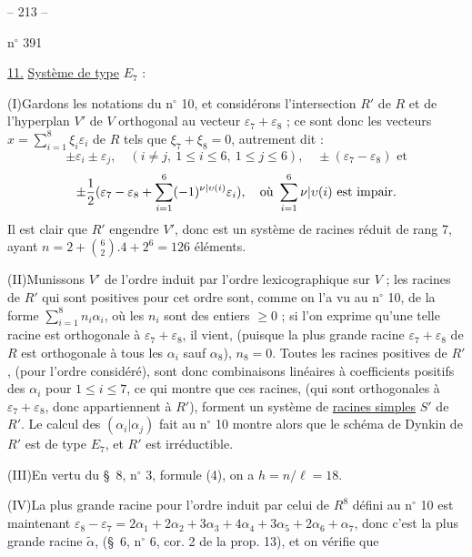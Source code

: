 \begin{center}-- 213 --\end{center}
\hfill n$^\circ$ 391

\uline{11.} \uline{Système de type} $E_7$ :

(I)\quad Gardons les notations du n$^\circ$ 10, et considérons l'intersection $R'$
de $R$ et de l'hyperplan $V'$ de $V$ orthogonal au vecteur
$\varepsilon_7+\varepsilon_8$ ; ce sont donc les vecteurs
$x=\sum_{i=1}^8\xi_i\varepsilon_i$ de $R$ tels que $\xi_7+\xi_8=0$,
autrement dit :
\[
\pm\varepsilon_i\pm\varepsilon_j,\quad
(i\neq j,\ 1\leq i\leq6,\ 1\leq j\leq6),\quad
\pm(\varepsilon_7-\varepsilon_8)\text{ et}
\]
\[
\pm\frac12(\varepsilon_7-\varepsilon_8+
\sum_{i=1}^6(-1)^{{\nu|\upsilon}(i)}\varepsilon_i),
\quad\text{où }\sum_{i=1}^6{\nu|\upsilon}(i)\text{ est {impair}.}
\]
Il est clair que $R'$ engendre $V'$, donc est un système de racines réduit
de rang 7, ayant $n=2+\binom62.4+2^6=126$ éléments.

(II)\quad Munissons $V'$ de l'ordre induit par l'ordre lexicographique sur $V$ ;
les racines de $R'$ qui sont positives pour cet ordre sont, comme on l'a vu au
n$^\circ$ 10, de la forme $\sum_{i=1}^8n_i\alpha_i$, où les $n_i$ sont des entiers
$\geq0$ ; si l'on exprime qu'une telle racine est orthogonale à
$\varepsilon_7+\varepsilon_8$, il vient, (puisque la plus grande racine
$\varepsilon_7+\varepsilon_8$ de $R$ est orthogonale à tous les $\alpha_i$
sauf $\alpha_8$), $n_8=0$. Toutes les racines positives de $R'$,
(pour l'ordre considéré), sont donc combinaisons linéaires à coefficients positifs
des $\alpha_i$ pour $1\leq i\leq7$, ce qui montre que ces racines,
(qui sont orthogonales à $\varepsilon_7+\varepsilon_8$, donc appartiennent à $R'$),
forment un système de \uline{racines simples} $S'$ de $R'$.
Le calcul des $(\alpha_i|\alpha_j)$ fait au n$^\circ$ 10 montre alors que le
schéma de Dynkin de $R'$ est de type $E_7$, et $R'$ est irréductible.

(III)\quad En vertu du \S\ 8, n$^\circ$ 3, formule (4), on a $h=n/\ell=18$.

(IV)\quad La plus grande racine pour l'ordre induit par celui de $R^8$
défini au n$^\circ$ 10 est maintenant
$\varepsilon_8-\varepsilon_7=2\alpha_1+2\alpha_2+3\alpha_3+4\alpha_4+
3\alpha_5+2\alpha_6+\alpha_7$, donc c'est la plus grande racine
$\tilde\alpha$, (\S\ 6, n$^\circ$ 6, cor. 2 de la prop. 13),
et on vérifie que
